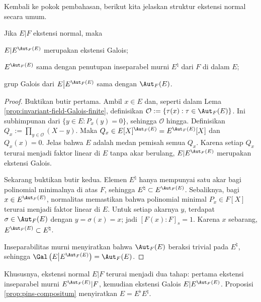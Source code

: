 Kembali ke pokok pembahasan, berikut kita jelaskan struktur ekstensi normal secara umum.
\begin{theorem}\label{prop:normal-ext-structure}
	Jika $E|F$ ekstensi normal, maka
	\begin{compactitem}
		\item $E|E^{\Aut_F(E)}$ merupakan ekstensi Galois;
		\item $E^{\Aut_F(E)}$ sama dengan penutupan inseparabel murni $E^\natural$ dari $F$ di dalam $E$;
		\item grup Galois dari $E\big|E^{\Aut_F(E)}$ sama dengan $\Aut_F(E)$.
	\end{compactitem}
\end{theorem}
\begin{proof}
	Buktikan butir pertama. Ambil $x\in E$ dan, seperti dalam Lema \ref{prop:invariant-field-Galois-finite}, definisikan $\mathcal{O}:=\{\tau(x):\tau\in\Aut_F(E)\}$. Ini subhimpunan dari $\{y\in E:P_x(y)=0\}$, sehingga $\mathcal{O}$ hingga. Definisikan $Q_x:=\prod_{y\in\mathcal{O}}(X-y)$. Maka $Q_x\in E[X]^{\Aut_F(E)}=E^{\Aut_F(E)}[X]$ dan $Q_x(x)=0$. Jelas bahwa $E$ adalah medan pemisah semua $Q_x$. Karena setiap $Q_x$ terurai menjadi faktor linear di $E$ tanpa akar berulang, $E|E^{\Aut_F(E)}$ merupakan ekstensi Galois.

	Sekarang buktikan butir kedua. Elemen $E^\natural$ hanya mempunyai satu akar bagi polinomial minimalnya di atas $F$, sehingga $E^\natural\subset E^{\Aut_F(E)}$. Sebaliknya, bagi $x\in E^{\Aut_F(E)}$, normalitas memastikan bahwa polinomial minimal $P_x\in F[X]$ terurai menjadi faktor linear di $E$. Untuk setiap akarnya $y$, terdapat $\sigma\in\Aut_F(E)$ dengan $y=\sigma(x)=x$; jadi $[F(x):F]_s=1$. Karena $x$ sebarang, $E^{\Aut_F(E)}\subset E^\natural$.
	
	Inseparabilitas murni menyiratkan bahwa $\Aut_F(E)$ beraksi trivial pada $E^\natural$, sehingga $\Gal\left(E\big|E^{\Aut_F(E)}\right)=\Aut_F(E)$.
\end{proof}
Khususnya, ekstensi normal $E|F$ terurai menjadi dua tahap: pertama ekstensi inseparabel murni $E^{\Aut_F(E)}|F$, kemudian ekstensi Galois $E|E^{\Aut_F(E)}$. Proposisi \ref{prop:pins-compositum} menyiratkan $E=E^\flat E^\natural$.

